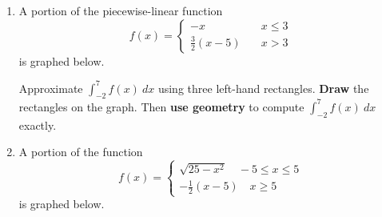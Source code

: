 \documentclass[11pt]{report}
\theoremstyle{plain}
\newcommand{\ds}{\displaystyle}
\begin{document}
\begin{enumerate}[{\bf {Problem} A.}]
\item A portion of the piecewise-linear function \[f(x) = \begin{cases} 
-x&\quad x\leq 3\\
\frac{3}{2}(x-5) &\quad x > 3
\end{cases} \]
is graphed below.

\begin{center}
\end{center}
Approximate $\ds \int_{-2}^{7} f(x) \ dx$ using three left-hand rectangles. {\bf Draw} the rectangles on the graph.
Then {\bf use geometry} to compute $\ds \int_{-2}^{7} f(x) \ dx$ exactly. %

\item A portion of the function \[f(x) = \begin{cases} \sqrt{25-x^{2}} \quad -5 \leq x \leq 5 \\ -\frac{1}{2}(x-5) \quad x \geq 5
\end{cases} \]
is graphed below.

\begin{center}
\begin{tikzpicture}[scale = .5]


\end{tikzpicture}
\end{center}
\end{enumerate}
\end{document}
